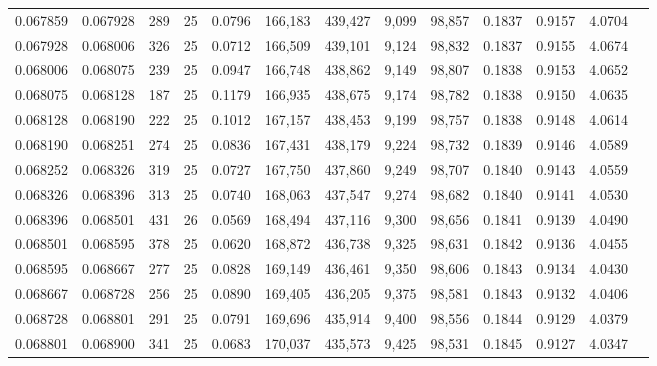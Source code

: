 \begin{tabular}{rrrrrrrrrrrrr}
0.067859 & 0.067928 &   289 &  25 &                                     0.0796 & 166,183 & 439,427 &   9,099 &  98,857 & 0.1837 & 0.9157 & 4.0704 \\
0.067928 & 0.068006 &   326 &  25 &                                     0.0712 & 166,509 & 439,101 &   9,124 &  98,832 & 0.1837 & 0.9155 & 4.0674 \\
0.068006 & 0.068075 &   239 &  25 &                                     0.0947 & 166,748 & 438,862 &   9,149 &  98,807 & 0.1838 & 0.9153 & 4.0652 \\
0.068075 & 0.068128 &   187 &  25 &                                     0.1179 & 166,935 & 438,675 &   9,174 &  98,782 & 0.1838 & 0.9150 & 4.0635 \\
0.068128 & 0.068190 &   222 &  25 &                                     0.1012 & 167,157 & 438,453 &   9,199 &  98,757 & 0.1838 & 0.9148 & 4.0614 \\
0.068190 & 0.068251 &   274 &  25 &                                     0.0836 & 167,431 & 438,179 &   9,224 &  98,732 & 0.1839 & 0.9146 & 4.0589 \\
0.068252 & 0.068326 &   319 &  25 &                                     0.0727 & 167,750 & 437,860 &   9,249 &  98,707 & 0.1840 & 0.9143 & 4.0559 \\
0.068326 & 0.068396 &   313 &  25 &                                     0.0740 & 168,063 & 437,547 &   9,274 &  98,682 & 0.1840 & 0.9141 & 4.0530 \\
0.068396 & 0.068501 &   431 &  26 &                                     0.0569 & 168,494 & 437,116 &   9,300 &  98,656 & 0.1841 & 0.9139 & 4.0490 \\
0.068501 & 0.068595 &   378 &  25 &                                     0.0620 & 168,872 & 436,738 &   9,325 &  98,631 & 0.1842 & 0.9136 & 4.0455 \\
0.068595 & 0.068667 &   277 &  25 &                                     0.0828 & 169,149 & 436,461 &   9,350 &  98,606 & 0.1843 & 0.9134 & 4.0430 \\
0.068667 & 0.068728 &   256 &  25 &                                     0.0890 & 169,405 & 436,205 &   9,375 &  98,581 & 0.1843 & 0.9132 & 4.0406 \\
0.068728 & 0.068801 &   291 &  25 &                                     0.0791 & 169,696 & 435,914 &   9,400 &  98,556 & 0.1844 & 0.9129 & 4.0379 \\
0.068801 & 0.068900 &   341 &  25 &                                     0.0683 & 170,037 & 435,573 &   9,425 &  98,531 & 0.1845 & 0.9127 & 4.0347 \\

\end{tabular}
